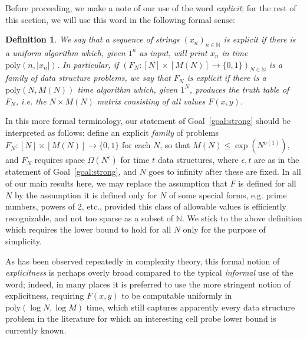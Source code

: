 \documentclass[11pt]{article}
\newtheorem{definition}{Definition}
\newcommand{\B}{\{0,1\}}
\newcommand{\poly}{\mathrm{poly}}
\begin{document}
Before proceeding, we make a note of our use of the word \emph{explicit}; for the rest of this section, we will use this word in the following formal sense:
\begin{definition}
We say that a sequence of strings $(x_n)_{n \in \mathbb{N}}$ is explicit if there is a uniform algorithm which, given $1^n$ as input, will print $x_n$ in time $\poly(n,|x_n|)$.
In particular, if $(F_N:[N] \times [M(N)] \to \B)_{N \in \mathbb{N}}$ is a family of data structure problems, we say that $F_N$ is explicit if there is a $\poly(N,M(N))$ time algorithm which, given $1^N$, produces the truth table of $F_N$, i.e. the $N \times M(N)$ matrix consisting of all values $F(x,y)$.
\end{definition}

In this more formal terminology, our statement of Goal~\ref{goal:strong} should be interpreted as follows: define an explicit \emph{family} of problems $F_N:[N] \times [M(N)] \to \B$ for each $N$, so that $M(N) \leq \exp(N^{o(1)})$, and $F_N$ requires space $\Omega(N^\epsilon)$ for time $t$ data structures, where $\epsilon,t$ are as in the statement of Goal~\ref{goal:strong}, and $N$ goes to infinity after these are fixed.
In all of our main results here, we may replace the assumption that $F$ is defined for all $N$ by the assumption it is defined only for $N$ of some special forms, e.g. prime numbers, powers of 2, etc., provided this class of allowable values is efficiently recognizable, and not too sparse as a subset of $\mathbb{N}$. We stick to the above definition which requires the lower bound to hold for all $N$ only for the purpose of simplicity.

As has been observed repeatedly in complexity theory, this formal notion of \emph{explicitness} is perhaps overly broad compared to the typical \emph{informal} use of the word; indeed, in many places it is preferred to use the more stringent notion of explicitness, requiring $F(x,y)$ to be computable uniformly in $\poly(\log N, \log M)$ time, which still captures apparently every data structure problem in the literature for which an interesting cell probe lower bound is currently known.
\end{document}
